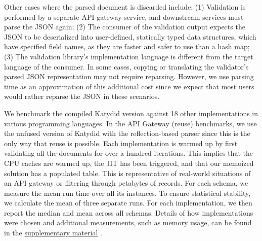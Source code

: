 \documentclass[acmsmall,%
  screen,%
  authorversion, %
  nonacm%
]{acmart}
\newcommand{\supplementarymaterial}{%
  \hyperref[supplementary_material]{supplementary material}\xspace%
}
\newcommand{\JSON}{\ac{JSON}\xspace}
\begin{document}
Other cases where the parsed document is discarded include: (1) Validation is performed by a separate API gateway service, and downstream services must parse the \JSON again; (2) The consumer of the validation output expects the \JSON to be deserialized into user-defined, statically typed data structures, which have specified field names, as they are faster and safer to use than a hash map; (3) The validation library's implementation language is different from the target language of the consumer.
In some cases, copying or translating the validator's parsed \JSON representation may not require reparsing.
However, we use parsing time as an approximation of this additional cost since we expect that most users would rather reparse the \JSON in these scenarios.

We benchmark the compiled Katydid version against 18 other implementations in various programming languages.
In the API Gateway (reuse) benchmarks, we use the unfused version of Katydid with the reflection-based parser since this is the only way that reuse is possible.
Each implementation is warmed up by first validating all the documents for over a hundred iterations.
This implies that the CPU caches are warmed up, the JIT has been triggered, and that our memoized solution has a populated table.
This is representative of real-world situations of an API gateway or filtering through petabytes of records.
For each schema, we measure the mean run time over all its instances.
To ensure statistical stability, we calculate the mean of three separate runs.
For each implementation, we then report the median and mean across all schemas.
Details of how implementations were chosen and additional measurements, such as memory usage, can be found in the \supplementarymaterial.
\end{document}
